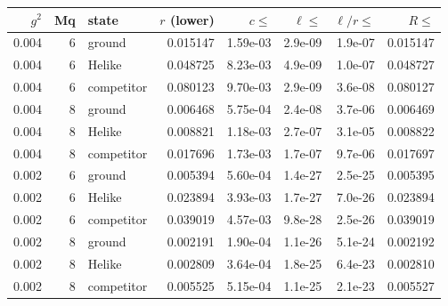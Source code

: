 \begin{tabular}{@{}rrlrrrrr@{}}\toprule $g^2$&Mq&state&$r$ (lower)&$c\leq$&$\ell\leq$&$\ell/r\leq$&$R\leq$\\\midrule
0.004&6&ground&0.015147&1.59e-03&2.9e-09&1.9e-07&0.015147\\
0.004&6&Helike&0.048725&8.23e-03&4.9e-09&1.0e-07&0.048727\\
0.004&6&competitor&0.080123&9.70e-03&2.9e-09&3.6e-08&0.080127\\
0.004&8&ground&0.006468&5.75e-04&2.4e-08&3.7e-06&0.006469\\
0.004&8&Helike&0.008821&1.18e-03&2.7e-07&3.1e-05&0.008822\\
0.004&8&competitor&0.017696&1.73e-03&1.7e-07&9.7e-06&0.017697\\
0.002&6&ground&0.005394&5.60e-04&1.4e-27&2.5e-25&0.005395\\
0.002&6&Helike&0.023894&3.93e-03&1.7e-27&7.0e-26&0.023894\\
0.002&6&competitor&0.039019&4.57e-03&9.8e-28&2.5e-26&0.039019\\
0.002&8&ground&0.002191&1.90e-04&1.1e-26&5.1e-24&0.002192\\
0.002&8&Helike&0.002809&3.64e-04&1.8e-25&6.4e-23&0.002810\\
0.002&8&competitor&0.005525&5.15e-04&1.1e-25&2.1e-23&0.005527\\
\bottomrule\end{tabular}
